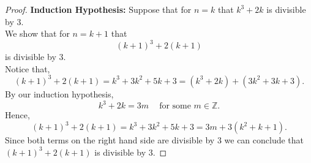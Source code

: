 \documentclass[11pt]{exam}
\theoremstyle{definition}
\begin{document}
\begin{questions}
\begin{proof}
{\bf Induction Hypothesis: }
Suppose that for $n=k$ that $k^3+2k$ is divisible by $3$.\\

We show that for $n=k+1$ that 
\[(k+1)^3+2(k+1)\]
is divisible by 3.\\

Notice that, 
\[(k+1)^3+2(k+1)= k^3+3k^2+5k+3=(k^3+2k)+(3k^2+3k+3).\]
By our induction hypothesis, 
\[k^3+2k=3m \ \ \ \ \text{ for some }m\in \mathbb{Z}.\]
Hence, 
\[(k+1)^3+2(k+1)= k^3+3k^2+5k+3=3m+3(k^2+k+1).\]
Since both terms on the right hand side are divisible by $3$ we can conclude that $(k+1)^3+2(k+1)$ is divisible by $3$. 



\end{proof}
\end{questions}
\end{document}
